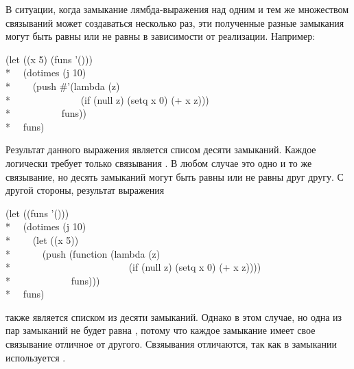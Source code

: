 \begin{defspec}
В ситуации, когда замыкание лямбда-выражения над одним и тем же множеством
связываний может создаваться несколько раз, эти полученные разные замыкания
могут быть равны или не равны  в зависимости от реализации.
Например:
\begin{lisp}
(let ((x 5) (funs '())) \\*
~~(dotimes (j 10) \\*
~~~~(push \#'(lambda (z) \\*
~~~~~~~~~~~~~~(if (null z) (setq x 0) (+ x z))) \\*
~~~~~~~~~~funs)) \\*
~~funs)
\end{lisp}
Результат данного выражения является списом десяти замыканий.
Каждое логически требует только связывания .
В любом случае это одно и то же связывание, но десять замыканий могут быть равны
или не равны  друг другу.
С другой стороны, результат выражения
\begin{lisp}
(let ((funs '())) \\*
~~(dotimes (j 10) \\*
~~~~(let ((x 5)) \\*
~~~~~~(push (function (lambda (z) \\*
~~~~~~~~~~~~~~~~~~~~~~~~(if (null z) (setq x 0) (+ x z)))) \\*
~~~~~~~~~~~~funs))) \\*
~~funs)
\end{lisp}
также является списком из десяти замыканий.
Однако в этом случае, но одна из пар замыканий не будет равна , потому
что каждое замыкание имеет свое связывание  отличное от
другого. Свзяывания отличаются, так как в замыкании используется .


\end{defspec}
